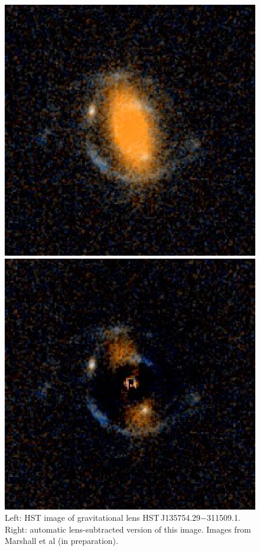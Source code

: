 \documentclass[useAMS,usenatbib]{mn2e}
\def\lens{HST\,J135754.29$-$311509.1}
\begin{document}
\begin{figure}
\begin{center}
\begin{minipage}{0.48\linewidth}
\centering\includegraphics[width=0.9\linewidth]{figs/HSTJ135754_29-311509_1_sci.eps} 
\end{minipage}\hfill
\begin{minipage}{0.48\linewidth}
\centering\includegraphics[width=0.9\linewidth]{figs/HSTJ135754_29-311509_1_sci_moffatdiff.eps} 
\end{minipage}
\caption{Left: HST image of gravitational lens \lens. Right:
automatic lens-subtracted version of this image. Images from
Marshall et al (in preparation).}
\label{fig:example}
\end{center}
\end{figure}
\end{document}
